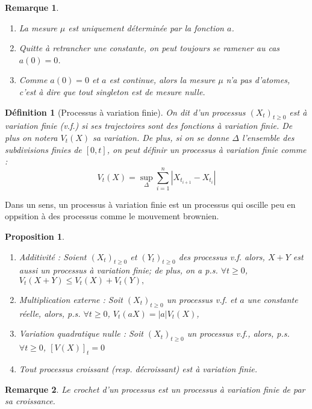 \documentclass[openany]{book}
\newcommand{\1}{\mathbbm{1}}
\theoremstyle{thmfont}
\theoremstyle{deffont}
\newtheorem{definition}[definition]{Définition}
\theoremstyle{thmfont}
\newtheorem{prop}[prop]{Proposition}
\theoremstyle{deffont}
\newtheorem{remark}[remark]{Remarque}
\begin{document}
\begin{remark}
  \begin{enumerate}
  \item La mesure $\mu$ est uniquement déterminée par la fonction $a$.
  \item Quitte à retrancher une constante, on peut toujours se ramener au cas $a(0) = 0$.
  \item Comme $a(0) = 0$ et $a$ est continue, alors la mesure $\mu$ n'a pas d'\textit{atomes}, c'est à dire que tout singleton est de mesure nulle.
  \end{enumerate}
\end{remark}

\begin{definition}[Processus à variation finie]
  On dit d'un processus $(X_t)_{t\geq0}$ est \textit{à variation finie} (v.f.) si ses trajectoires sont des fonctions à variation finie. De plus on notera $V_t(X)$ sa variation. De plus, si on se donne $\Delta$ l'ensemble des subdivisions finies de $[0,t]$, on peut définir un processus à variation finie comme :
%
  $$V_t(X) = \sup_{\Delta} \sum_{i=1}^n |X_{t_{i+1}} - X_{t_{i}}|$$
\end{definition}

Dans un sens, un processus à variation finie est un processus qui oscille peu en oppsition à des processus comme le mouvement brownien. 

\begin{prop}
  \begin{enumerate}[nosep]
  \item Additivité : Soient $(X_t)_{t\geq0}$ et $(Y_t)_{t\geq0}$ des processus v.f. alors, $X+Y$ est aussi un processus à variation finie; de plus, on a p.s. $\forall t \geq 0$, $V_t(X+Y) \leq V_t(X)+V_t(Y),$
  \item Multiplication externe : Soit $(X_t)_{t\geq0}$ un processus v.f. et $a$ une constante réelle, alors, p.s. $\forall t\geq0$, $V_t(aX) = |a| V_t(X)$,
  \item Variation quadratique nulle : Soit $(X_t)_{t\geq0}$ un processus v.f., alors, p.s. $\forall t \geq 0$, $[V(X)]_t=0$
  \item Tout processus croissant (resp. décroissant) est à variation finie.
  \end{enumerate}
\end{prop}

\begin{remark}
  Le crochet d'un processus est un processus à variation finie de par sa croissance.
\end{remark}
\end{document}

